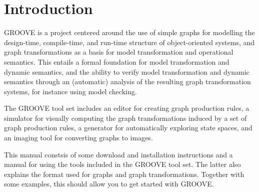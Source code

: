 \section{Introduction}

GROOVE is a project centered around the use of simple graphs for
modelling the design-time, compile-time, and run-time structure of
object-oriented systems, and graph transformations as a basis for
model transformation and operational semantics. This entails a formal
foundation for  model transformation and dynamic semantics, and the
ability to verify model transformation and dynamic semantics through
an (automatic) analysis of the resulting graph transformation systems,
for instance using model checking.

The GROOVE tool set includes an editor for creating graph production
rules, a simulator for visually computing the graph transformations
induced by a set of graph production rules, a generator for
automatically exploring state spaces, and an imaging tool for
converting graphs to images.

This manual constsis of some download and installation instructions and a
manual for using the tools included in the GROOVE tool set. The latter also
explains the format used for graphs and graph transformations. Together
with some examples, this should allow you to get started with GROOVE.
